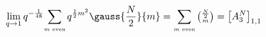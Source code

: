\begin{equation}
\lim_{q\to 1} q^{-{1\over 48}}\!
\sum_{\mbox{\tiny $m$ even}} q^{{1\over 2}m^2}\gauss{{N\over 2}}{m}
=\sum_{\mbox{\tiny $m$ even}}\mbox{\small ${{N\over 2}\choose m}$}
=\big[A_3^N\big]_{1,1}
\end{equation}

